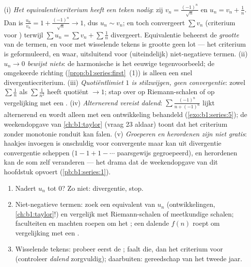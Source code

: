 \begin{remark}
(i) \emph{Het equivalentiecriterium heeft een teken nodig}: zij
$v_n = \frac{(-1)^n}{\sqrt n}$ en $u_n = v_n + \frac1n$. Dan is
$\frac{u_n}{v_n} = 1 + \frac{(-1)^n}{\sqrt n} \to 1$, dus $u_n
\sim v_n$; en toch convergeert $\sum v_n$ (criterium voor
) terwijl $\sum u_n = \sum v_n + \sum
\frac1n$ divergeert. Equivalentie beheerst de \emph{grootte} van
de termen, en voor  met wisselende tekens is grootte geen
lot --- het criterium is geformuleerd, en waar, uitsluitend voor
(uiteindelijk) niet-negatieve termen. (ii) \emph{$u_n \to 0$
bewijst niets}: de harmonische  is het eeuwige
tegenvoorbeeld; de omgekeerde richting
(\cref{prop:b1:series:first}~(1)) is alleen een snel
divergentiecriterium. (iii) \emph{Quotiëntlimiet $1$ is
stilzwijgen, geen convergentie}: zowel $\sum\frac1n$ als
$\sum\frac{1}{n^2}$ heeft quotiënt $\to 1$; stap over op
Riemann-schalen of op vergelijking met een . (iv)
\emph{Alternerend vereist dalend}: $\sum \frac{(-1)^n}{n +
(-1)^n}$ lijkt alternerend en wordt alleen met een ontwikkeling
behandeld (\cref{exo:b1:series:5}); de weekendopgave van
\cref{ch:b1:taylor} (vraag 23 aldaar) toont dat het criterium
zonder monotonie ronduit kan falen. (v) \emph{Groeperen en
herordenen zijn niet gratis}: haakjes invoegen is onschuldig
voor convergente  maar kan uit divergentie convergentie
scheppen ($1 - 1 + 1 - \cdots$ paarsgewijs gegroepeerd), en
herordenen kan de som zelf veranderen --- het drama dat de
weekendopgave van dit hoofdstuk opvoert
(\cref{pb:b1:series:1}).
\end{remark}

\begin{method}\label{met:b1:series:decide}
\begin{enumerate}
  \item Nadert $u_n$ tot $0$? Zo niet: divergentie, stop.
  \item Niet-negatieve termen: zoek een equivalent van $u_n$
        (ontwikkelingen, \cref{ch:b1:taylor}!) en vergelijk met
        Riemann-schalen of meetkundige schalen; faculteiten en
        machten roepen om het ; een dalende
        $f(n)$ roept om vergelijking met een .
  \item Wisselende tekens: probeer eerst de ;
        faalt die, dan het criterium voor 
        (controleer \emph{dalend} zorgvuldig); daarbuiten:
        gereedschap van het tweede jaar.
\end{enumerate}
\end{method}

